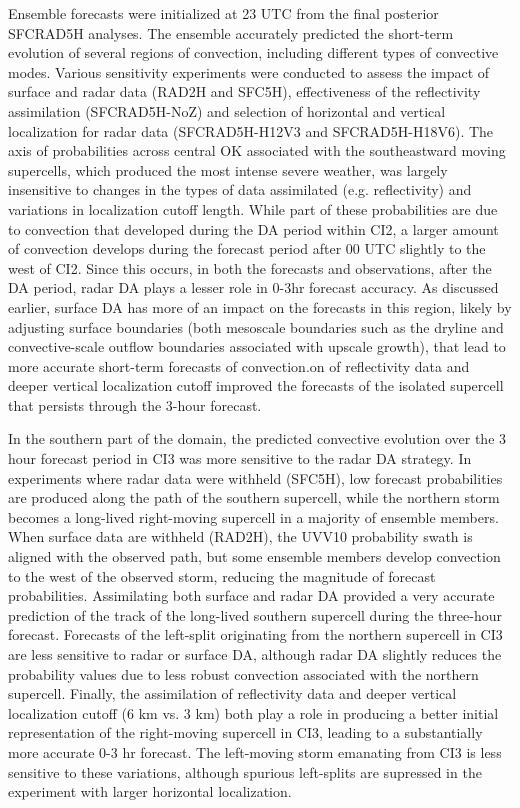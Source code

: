 Ensemble forecasts were initialized at 23 UTC from the final posterior SFCRAD5H analyses. The ensemble accurately predicted the short-term evolution of several regions of convection, including different types of convective modes. Various sensitivity experiments were conducted to assess the impact of surface and radar data (RAD2H and SFC5H), effectiveness of the reflectivity assimilation (SFCRAD5H-NoZ) and selection of horizontal and vertical localization for radar data (SFCRAD5H-H12V3 and SFCRAD5H-H18V6). The axis of probabilities across central OK associated with the southeastward moving supercells, which produced the most intense severe weather, was largely insensitive to changes in the types of data assimilated (e.g. reflectivity) and variations in localization cutoff length. While part of these probabilities are due to convection that developed during the DA period within CI2, a larger amount of convection develops during the forecast period after 00 UTC slightly to the west of CI2. Since this occurs, in both the forecasts and observations, after the DA period, radar DA plays a lesser role in 0-3hr forecast accuracy. As discussed earlier, surface DA has more of an impact on the forecasts in this region, likely by adjusting surface boundaries (both mesoscale boundaries such as the dryline and convective-scale outflow boundaries associated with upscale growth), that lead to more accurate short-term forecasts of convection.on of reflectivity data and deeper vertical localization cutoff improved the forecasts of the isolated supercell that persists through the 3-hour forecast.

In the southern part of the domain, the predicted convective evolution over the 3 hour forecast period in CI3 was more sensitive to the radar DA strategy. In experiments where radar data were withheld (SFC5H), low forecast probabilities are produced along the path of the southern supercell, while the northern storm becomes a long-lived right-moving supercell in a majority of ensemble members. When surface data are withheld (RAD2H), the UVV10 probability swath is aligned with the observed path, but some ensemble members develop convection to the west of the observed storm, reducing the magnitude of forecast probabilities. Assimilating both surface and radar DA provided a very accurate prediction of the track of the long-lived southern supercell during the three-hour forecast. Forecasts of the left-split originating from the northern supercell in CI3 are less sensitive to radar or surface DA, although radar DA slightly reduces the probability values due to less robust convection associated with the northern supercell. Finally, the assimilation of reflectivity data and deeper vertical localization cutoff (6 km vs. 3 km) both play a role in producing a better initial representation of the right-moving supercell in CI3, leading to a substantially more accurate 0-3 hr forecast. The left-moving storm emanating from CI3 is less sensitive to these variations, although spurious left-splits are supressed in the experiment with larger horizontal localization.
